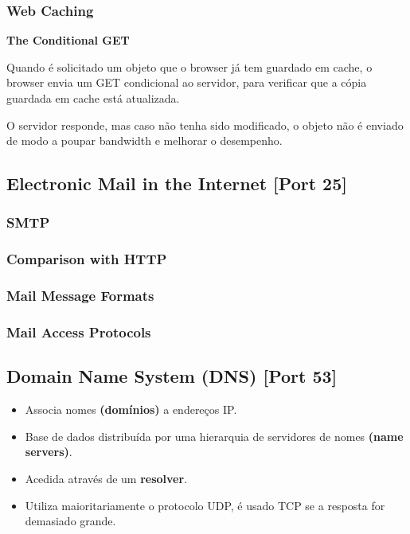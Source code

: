 \documentclass[12pt]{article}
\begin{document}
\subsubsection{Web Caching}

\subsubitem \textbf{The Conditional GET}

Quando é solicitado um objeto que o browser já tem guardado em cache, o browser envia um GET condicional ao servidor, para verificar que a cópia guardada em cache está atualizada. \par
O servidor responde, mas caso não tenha sido modificado, o objeto não é enviado de modo a poupar bandwidth e melhorar o desempenho.

\subsection{Electronic Mail in the Internet [Port 25]}

\subsubsection{SMTP}

\subsubsection{Comparison with HTTP}

\subsubsection{Mail Message Formats}

\subsubsection{Mail Access Protocols}

\subsection{Domain Name System (DNS) [Port 53]}

\begin{itemize}
    \item Associa nomes \textbf{(domínios)} a endereços IP.
    \item Base de dados distribuída por uma hierarquia de servidores de nomes \textbf{(name servers)}.
    \item Acedida através de um \textbf{resolver}.
    \item Utiliza maioritariamente o protocolo UDP, é usado TCP se a resposta for demasiado grande.
\end{itemize}
\end{document}
